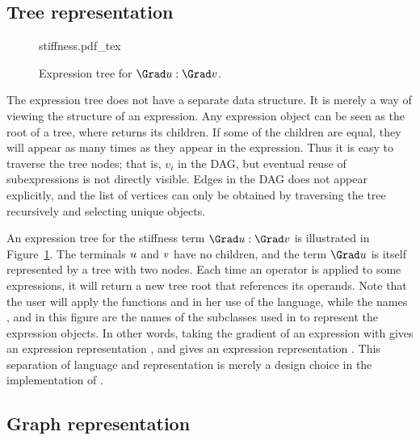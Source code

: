 \subsection{Tree representation}

\begin{figure}
\def\svgwidth{\largefig}
{stiffness.pdf_tex}
\caption{Expression tree for $\Grad \uu : \Grad \vv$.}
\label{ufl:fig:stiffness}
\end{figure}

The expression tree does not have a separate data structure. It is merely
a way of viewing the structure of an expression. Any expression object
 can be seen as the root of a tree, where 
returns its children. If some of the children are equal, they will
appear as many times as they appear in the expression. Thus it is easy
to traverse the tree nodes; that is, $v_i$ in the DAG, but eventual
reuse of subexpressions is not directly visible. Edges in the DAG does
not appear explicitly, and the list of vertices can only be obtained by
traversing the tree recursively and selecting unique objects.

An expression tree for the stiffness term $\Grad\uu :\Grad\vv$ is
illustrated in Figure~\ref{ufl:fig:stiffness}.  The terminals ${u}$ and
${v}$ have no children, and the term $\Grad\uu$ is itself represented by a
tree with two nodes. Each time an operator is applied to some expressions,
it will return a new tree root that references its operands. Note that
the user will apply the functions  and  in her use of
the language, while the names ,  and 
in this figure are the names of the  subclasses used in \ufl{}
to represent the expression objects.  In other words, taking the gradient
of an expression with  gives an expression representation
, and  gives an expression representation
. This separation of language and representation is
merely a design choice in the implementation of \ufl{}.

\subsection{Graph representation} \label{ufl:sec:graphs}

